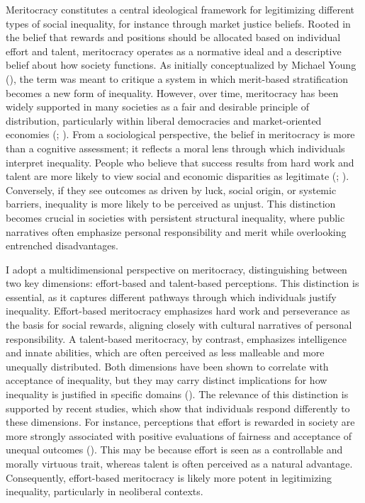 \documentclass[
  12pt,
]{article}
\begin{document}
Meritocracy constitutes a central ideological framework for legitimizing
different types of social inequality, for instance through market
justice beliefs. Rooted in the belief that rewards and positions should
be allocated based on individual effort and talent, meritocracy operates
as a normative ideal and a descriptive belief about how society
functions. As initially conceptualized by Michael Young
(), the term
was meant to critique a system in which merit-based stratification
becomes a new form of inequality. However, over time, meritocracy has
been widely supported in many societies as a fair and desirable
principle of distribution, particularly within liberal democracies and
market-oriented economies (; ).
From a sociological perspective, the belief in meritocracy is more than
a cognitive assessment; it reflects a moral lens through which
individuals interpret inequality. People who believe that success
results from hard work and talent are more likely to view social and
economic disparities as legitimate
(;
).
Conversely, if they see outcomes as driven by luck, social origin, or
systemic barriers, inequality is more likely to be perceived as unjust.
This distinction becomes crucial in societies with persistent structural
inequality, where public narratives often emphasize personal
responsibility and merit while overlooking entrenched disadvantages.

I adopt a multidimensional perspective on meritocracy, distinguishing
between two key dimensions: effort-based and talent-based perceptions.
This distinction is essential, as it captures different pathways through
which individuals justify inequality. Effort-based meritocracy
emphasizes hard work and perseverance as the basis for social rewards,
aligning closely with cultural narratives of personal responsibility. A
talent-based meritocracy, by contrast, emphasizes intelligence and
innate abilities, which are often perceived as less malleable and more
unequally distributed. Both dimensions have been shown to correlate with
acceptance of inequality, but they may carry distinct implications for
how inequality is justified in specific domains
().
The relevance of this distinction is supported by recent studies, which
show that individuals respond differently to these dimensions. For
instance, perceptions that effort is rewarded in society are more
strongly associated with positive evaluations of fairness and acceptance
of unequal outcomes (). This may be because effort is seen as a controllable and morally
virtuous trait, whereas talent is often perceived as a natural
advantage. Consequently, effort-based meritocracy is likely more potent
in legitimizing inequality, particularly in neoliberal contexts.
\end{document}
